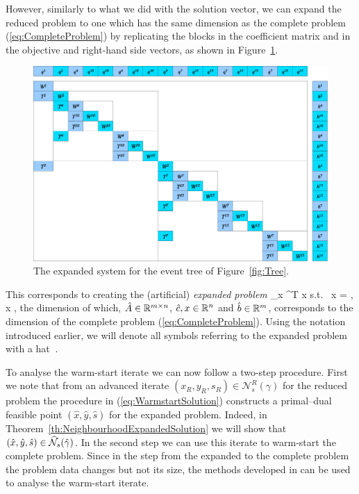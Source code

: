 However, similarly to what we did with the solution vector, 
we can expand the reduced problem to one which has the same dimension 
as the complete problem (\ref{eq:CompleteProblem}) by replicating
the blocks in the coefficient matrix and in the objective and right-hand 
side vectors, as shown in Figure~\ref{fig:ExpandedSystem}.
%
\begin{figure}[ht]
  \begin{center}
    \includegraphics[scale=.49]{figures/expandedsystem.eps}
    \caption{The expanded system for the event tree of Figure~\ref{fig:Tree}.}
    \label{fig:ExpandedSystem}
  \end{center}
  \vspace{-3ex}
\end{figure}

This corresponds to creating the (artificial) {\em expanded problem}
\be \label{eq:ExpandedProblem}
\min_x\; ^T x \;\quad \mbox{s.t. }\;  x = ,
    \; x ,
\ee
the dimension of which, $\hat{A} \in \mathbb{R}^{m\times n}$, 
$\hat{c}, x \in \mathbb{R}^{n}$ and $\hat{b} \in \mathbb{R}^{m}$,
corresponds to the dimension of the complete problem 
(\ref{eq:CompleteProblem}).
Using the notation introduced earlier, we will denote 
all symbols referring to the expanded problem with a hat $\hat{\ }$.

To analyse the warm-start iterate we can now follow a two-step
procedure. First we note that from an advanced iterate 
$(x_R, y_R,  s_R)\in\mathcal{N}^R_s(\gamma)$ for the reduced
problem the procedure in (\ref{eq:WarmstartSolution}) constructs a
primal--dual feasible point $(\hat{x}, \hat{y}, \hat{s})$ for the 
expanded problem. Indeed,
in Theorem~\ref{th:NeighbourhoodExpandedSolution} we will show that
$(\hat{x}, \hat{y}, \hat{s})\in\widehat{\mathcal{N}}_s(\hat{\gamma})$.
In the second step we
can use this iterate to warm-start the complete problem. Since in the
step from the expanded to the complete problem the problem data
changes but not its size, the methods developed in
\cite{GondzioGrothey03,YildirimWright} can be used to analyse the 
warm-start iterate.

